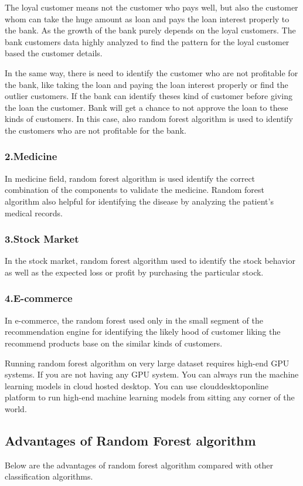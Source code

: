 \documentclass[a4paper,12pt]{article}
\begin{document}
The loyal customer means not the customer who pays well, but also the customer whom can take the huge amount as loan and pays the loan interest properly to the bank. As the growth of the bank purely depends on the loyal customers. The bank customers data highly analyzed to find the pattern for the loyal customer based the customer details.

In the same way, there is need to identify the customer who are not profitable for the bank, like taking the loan and paying the loan interest properly or find the outlier customers. If the bank can identify theses kind of customer before giving the loan the customer.  Bank will get a chance to not approve the loan to these kinds of customers. In this case, also random forest algorithm is used to identify the customers who are not profitable for the bank.

\subsubsection*{2.Medicine}
In medicine field, random forest algorithm is used identify the correct combination of the components to validate the medicine. Random forest algorithm also helpful for identifying the disease by analyzing the patient’s medical records.

\subsubsection*{3.Stock Market}
In the stock market, random forest algorithm used to identify the stock behavior as well as the expected loss or profit by purchasing the particular stock.

\subsubsection*{4.E-commerce}
In e-commerce, the random forest used only in the small segment of the recommendation engine for identifying the likely hood of customer liking the recommend products base on the similar kinds of customers.

Running random forest algorithm on very large dataset requires high-end GPU systems. If you are not having any GPU system. You can always run the machine learning models in cloud hosted desktop. You can use clouddesktoponline platform to run high-end machine learning models from sitting any corner of the world.

\subsection*{Advantages of Random Forest algorithm}
Below are the advantages of random forest algorithm compared with other classification algorithms.
\end{document}
